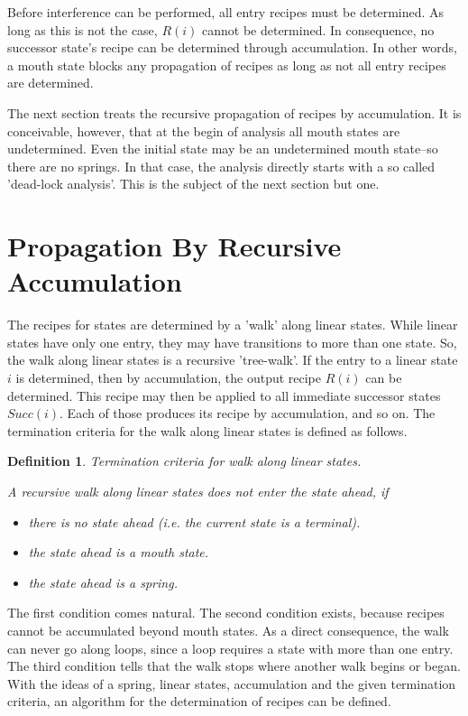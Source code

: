 \documentclass[12pt,a4paper]{scrartcl}
\newtheorem{definition}{Definition}
\begin{document}
Before interference can be performed, all entry recipes must be determined.  As
long as this is not the case, $R(i)$ cannot be determined. In consequence, no
successor state's recipe can be determined through accumulation. In other
words,  a mouth state blocks any propagation of recipes as long as not all
entry recipes are determined. 

The next section treats the recursive propagation of recipes by accumulation.
It is conceivable, however, that at the begin of analysis all mouth states are
undetermined. Even the initial state may be an undetermined mouth state--so
there are no springs. In that case, the analysis directly starts with a so
called 'dead-lock analysis'. This is the subject of the next section but one.

%
\section{Propagation By Recursive Accumulation}

The recipes for states are determined by a 'walk' along linear states. While
linear states have only one entry, they may have transitions to more than one
state. So, the walk along linear states is a recursive 'tree-walk'. If the
entry to a linear state $i$ is determined, then by accumulation, the output
recipe $R(i)$ can be determined. This recipe may then be applied to all
immediate successor states $Succ(i)$. Each of those produces its recipe by
accumulation, and so on. The termination criteria for the walk along linear
states is defined as follows.

\begin{definition}
Termination criteria for walk along linear states.

A recursive walk along linear states does not enter the state ahead, if 

\begin{itemize}
    \item there is no state ahead (i.e. the current state is a terminal).
    \item the state ahead is a mouth state.
    \item the state ahead is a spring.
\end{itemize}
\end{definition}

The first condition comes natural. The second condition exists, because recipes
cannot be accumulated beyond mouth states. As a direct consequence, the walk
can never go along loops, since a loop requires a state with more than one
entry. The third condition tells that the walk stops where another walk begins
or began.  With the ideas of a spring, linear states, accumulation and the
given termination criteria, an algorithm for the determination of recipes can
be defined.
\end{document}
